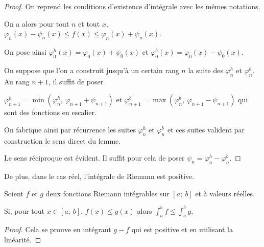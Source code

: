 \begin{proof}
On reprend les conditions d'existence d'intégrale avec les mêmes notations.

On a alors pour tout $n$ et tout $x$, $\varphi_n(x) - \psi_n(x) \leq f(x) \leq \varphi_n(x) + \psi_n(x)$.

On pose ainsi $\varphi_0^h(x) = \varphi_0(x) + \psi_0(x)$ et $\varphi_0^b(x) = \varphi_0(x) - \psi_0(x)$.

On suppose que l'on a construit jusqu'à un certain rang $n$ la suite des $\varphi_n^h$ et $\varphi_n^b$. Au rang $n+1$, il suffit de poser 

$\varphi_{n+1}^h = \min\left(\varphi_n^h,~\varphi_{n+1}+ \psi_{n+1}\right)$ et $\varphi_{n+1}^b = \max\left(\varphi_n^b,~\varphi_{n+1} - \psi_{n+1}\right)$ qui sont des fonctions en escalier.

On fabrique ainsi par récurrence les suites $\varphi_n^h$ et $\varphi_n^b$ et ces suites valident par construction le sens direct du lemme.

Le sens réciproque est évident. Il suffit pour cela de poser $\psi_n = \varphi_n^h - \varphi_n^b$.
\end{proof}

De plus, dans le cas réel, l'intégrale de Riemann est positive.

\begin{prop}
Soient $f$ et $g$ deux fonctions Riemann intégrables sur $[a;~b]$ et à valeurs réelles.

Si, pour tout $x \in [a;~b]$, $f(x) \leq g(x)$ alors $\displaystyle{\int_a^b} f \leq \displaystyle{\int_a^b} g$.
\end{prop}

\begin{proof}
Cela se prouve en intégrant $g-f$ qui est positive et en utilisant la linéarité.
\end{proof}

